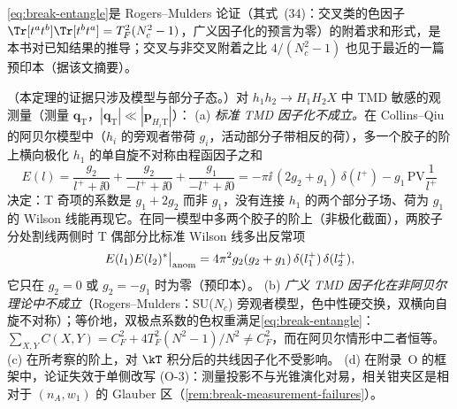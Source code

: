 \cref{eq:break-entangle}是 Rogers--Mulders 论证（其式~(34)：交叉类的色因子 $\Tr[t^at^b]\Tr[t^bt^a]=T_F^2(N_c^2-1)$，广义因子化的预言为零）的附着求和形式，是本书对已知结果的推导；交叉与非交叉附着之比 $4/(N_c^2-1)$ 也见于最近的一篇预印本\cite{Zhou:2026ids}（据该文摘要）。

\begin{theorem}\label{thm:break-tmd}
（本定理的证据只涉及模型与部分子态。）对 $h_1h_2\to H_1H_2X$ 中 TMD 敏感的观测量（测量 $\boldsymbol q_{\mathrm T}$，$|\boldsymbol q_{\mathrm T}|\ll|\boldsymbol p_{H_i\mathrm T}|$）：
(a) \emph{标准 TMD 因子化不成立。}在 Collins--Qiu 的阿贝尔模型中（$h_i$ 的旁观者带荷 $g_i$，活动部分子带相反的荷），多一个胶子的阶上横向极化 $h_1$ 的单自旋不对称由程函因子之和
\begin{equation}\label{eq:break-El}
E(l)=\frac{g_2}{l^++\ii0}+\frac{g_2}{-l^++\ii0}+\frac{g_1}{-l^++\ii0}=-\pi\ii\,(2g_2+g_1)\,\delta(l^+)-g_1\,\mathrm{PV}\frac1{l^+}
\end{equation}
决定：T 奇项的系数是 $g_1+2g_2$ 而非 $g_1$，没有连接 $h_1$ 的两个部分子场、荷为 $g_1$ 的 Wilson 线能再现它\cite{CollinsQiu2007}。在同一模型中多两个胶子的阶上（非极化截面），两胶子分处割线两侧时 T 偶部分比标准 Wilson 线多出反常项
\begin{equation}\label{eq:break-anomaly}
E(l_1)E(l_2)^*\big|_{\rm anom}=4\pi^2g_2(g_2+g_1)\,\delta(l_1^+)\,\delta(l_2^+),
\end{equation}
它只在 $g_2=0$ 或 $g_2=-g_1$ 时为零\cite{Collins2007}（预印本）。
(b) \emph{广义 TMD 因子化在非阿贝尔理论中不成立}（Rogers--Mulders：SU($N_c$) 旁观者模型，色中性硬交换，双横向自旋不对称\cite{RogersMulders2010}）；等价地，双极点系数的色权重满足\cref{eq:break-entangle}：$\sum_{X,Y}C(X,Y)=C_F^2+4T_F^2(N^2-1)/N^2\neq C_F^2$，而在阿贝尔情形中二者恒等。
(c) 在所考察的阶上，对 $\kT$ 积分后的共线因子化不受影响\cite{Collins2007}。
(d) 在附录~O 的框架中，论证失效于单侧改写 (O-3)：测量投影不与光锥演化对易，相关钳夹区是相对于 $(n_A,w_1)$ 的 Glauber 区（\cref{rem:break-measurement-failures}）。
\end{theorem}

